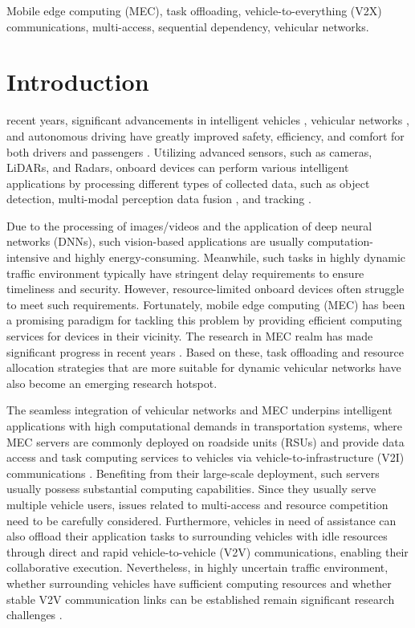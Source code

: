 \documentclass[lettersize,journal]{IEEEtran}
\begin{document}
\begin{IEEEkeywords}
Mobile edge computing (MEC), task offloading, vehicle-to-everything (V2X) communications, multi-access, sequential dependency, vehicular networks.
\end{IEEEkeywords}

\section{Introduction}
 recent years, significant advancements in intelligent vehicles \cite{ref1}, vehicular networks \cite{ref2,ref3}, and autonomous driving \cite{ref4} have greatly improved safety, efficiency, and comfort for both drivers and passengers \cite{ref5}. Utilizing advanced sensors, such as cameras, LiDARs, and Radars, onboard devices can perform various intelligent applications by processing different types of collected data, such as object detection, multi-modal perception data fusion \cite{ref6}, and tracking \cite{ref7}.

Due to the processing of images/videos and the application of deep neural networks (DNNs), such vision-based applications are usually computation-intensive and highly energy-consuming. Meanwhile, such tasks in highly dynamic traffic environment typically have stringent delay requirements to ensure timeliness and security. However, resource-limited onboard devices often struggle to meet such requirements. Fortunately, mobile edge computing (MEC) \cite{ref8} has been a promising paradigm for tackling this problem by providing efficient computing services for devices in their vicinity. The research in MEC realm has made significant progress in recent years \cite{ref9,ref10,ref11}. Based on these, task offloading and resource allocation strategies that are more suitable for dynamic vehicular networks have also become an emerging research hotspot.


The seamless integration of vehicular networks and MEC underpins intelligent applications with high computational demands in transportation systems, where MEC servers are commonly deployed on roadside units (RSUs) and provide data access and task computing services to vehicles via vehicle-to-infrastructure (V2I) communications \cite{ref12}. Benefiting from their large-scale deployment, such servers usually possess substantial computing capabilities. Since they usually serve multiple vehicle users, issues related to multi-access and resource competition need to be carefully considered. Furthermore, vehicles in need of assistance can also offload their application tasks to surrounding vehicles with idle resources through direct and rapid vehicle-to-vehicle (V2V) communications, enabling their collaborative execution. Nevertheless, in highly uncertain traffic environment, whether surrounding vehicles have sufficient computing resources and whether stable V2V communication links can be established remain significant research challenges \cite{ref13}.
\end{document}
